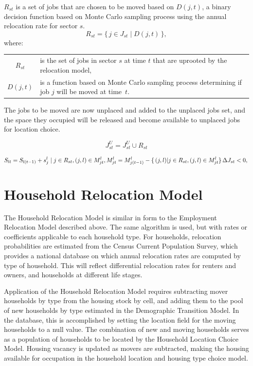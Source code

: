 $R_{st}$ is a set of jobs that are chosen to be moved based on $D(j,
t)$, a binary decision function based on Monte Carlo sampling
process using the annual relocation rate for sector $s$.
\begin{equation}
R_{st} = \{\, j \in J_{st} \mid D(j,t) \,\},
\end{equation}
where:
\begin{center}
\begin{tabular}{c p{5.5in}}
$R_{st}$ & is the set of jobs in sector $s$ at time $t$ that are
uprooted by the relocation model,\\
$D(j,t)$ & is a function based on Monte Carlo sampling process determining if job
$j$ will be moved at \mbox{time $t$}.\\
\end{tabular}
\end{center}

The jobs to be moved are now unplaced and added to the
unplaced jobs set, and the space they occupied will be released
and become available to unplaced jobs for location choice.

\begin{equation}
J^U_{st} = J^U_{st} \cup R_{st}
\end{equation}


\begin{equation}
S_{lt} = S_{l(t-1)} + s^l_j \mid j \in R_{st}, (j, l) \in M^l_{jt},\\
M^l_{jt} = M^l_{j(t-1)} - \{\, (j, l) | j \in R_{st}, (j, l) \in M^l_{jt} \}\, \Delta J_{st} < 0, \\
\end{equation}

\section{Household Relocation Model}

The Household Relocation Model is similar in form to the Employment
Relocation Model described above.  The same algorithm is used, but
with rates or coefficients applicable to each household type.  For
households, relocation probabilities are estimated from the Census
Current Population Survey, which provides a national database on
which annual relocation rates are computed by type of household.
This will reflect differential relocation rates for renters and
owners, and households at different life stages.

Application of the Household Relocation Model requires subtracting
mover households by type from the housing stock by cell, and
adding them to the pool of new households by type estimated in the
Demographic Transition Model. In the database, this is
accomplished by setting the location field for the moving
households to a null value.  The combination of new and moving
households serves as a population of households to be located by
the Household Location Choice Model. Housing vacancy is updated as
movers are subtracted, making the housing available for occupation
in the household location and housing type choice model.

